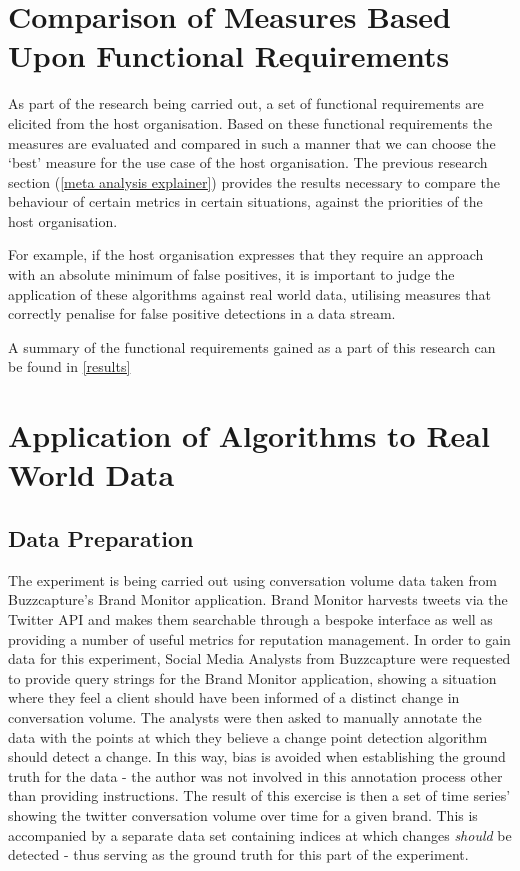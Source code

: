 \documentclass[../main.tex]{subfiles}
\begin{document}
\section{Comparison of Measures Based Upon Functional Requirements}

As part of the research being carried out, a set of functional requirements are elicited from the host organisation. Based on these functional requirements the measures are evaluated and compared in such a manner that we can choose the `best' measure for the use case of the host organisation. The previous research section (\autoref{meta analysis explainer}) provides the results necessary to compare the behaviour of certain metrics in certain situations, against the priorities of the host organisation.

For example, if the host organisation expresses that they require an approach with an absolute minimum of false positives, it is important to judge the application of these algorithms against real world data, utilising measures that correctly penalise for false positive detections in a data stream.

A summary of the functional requirements gained as a part of this research can be found in \autoref{results}


\section{Application of Algorithms to Real World Data}
\label{real world explainer}

\subsection{Data Preparation}

The experiment is being carried out using conversation volume data taken from Buzzcapture's Brand Monitor application. Brand Monitor harvests tweets via the Twitter API and makes them searchable through a bespoke interface as well as providing a number of useful metrics for reputation management. In order to gain data for this experiment, Social Media Analysts from Buzzcapture were requested to provide query strings for the Brand Monitor application, showing a situation where they feel a client should have been informed of a distinct change in conversation volume. The analysts were then asked to manually annotate the data with the points at which they believe a change point detection algorithm should detect a change. In this way, bias is avoided when establishing the ground truth for the data - the author was not involved in this annotation process other than providing instructions. The result of this exercise is then a set of time series' showing the twitter conversation volume over time for a given brand. This is accompanied by a separate data set containing indices at which changes \emph{should} be detected - thus serving as the ground truth for this part of the experiment.
\end{document}
